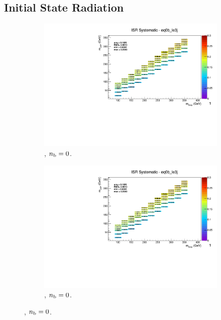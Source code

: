 \newpage
\subsection*{Initial State Radiation}
\label{sec:t2cc_isr_plots}

\begin{figure}[ht!]
  \centering
  \begin{subfigure}[b]{0.32\textwidth}
    \includegraphics[width=\textwidth, page=12]{Figs/sms/t2cc/v37/systs_v2/T2cc_ISR_eq0b_le3j.pdf}
    \caption{\njlow, $n_{\text{b}} = 0$.}
  \end{subfigure}
  \begin{subfigure}[b]{0.32\textwidth}
    \includegraphics[width=\textwidth, page=8]{Figs/sms/t2cc/v37/systs_v2/T2cc_ISR_eq0b_le3j.pdf}
    \caption{\njlow, $n_{\text{b}} = 0$.}
  \end{subfigure}

\end{figure}
